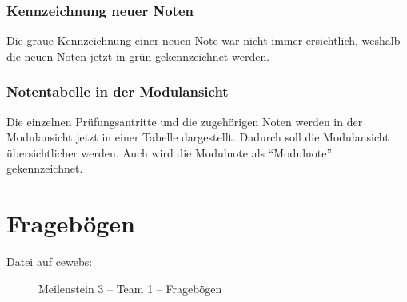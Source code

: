 \documentclass[a4paper,10pt]{scrartcl}
\begin{document}
\subsubsection*{Kennzeichnung neuer Noten}

Die graue Kennzeichnung einer neuen Note war nicht immer ersichtlich, weshalb die neuen Noten jetzt in grün gekennzeichnet werden.

\noindent{}
\medskip

\subsubsection*{Notentabelle in der Modulansicht}

Die einzelnen Prüfungsantritte und die zugehörigen Noten werden in der Modulansicht jetzt in einer Tabelle dargestellt. Dadurch soll die Modulansicht übersichtlicher werden. Auch wird
die Modulnote als ``Modulnote'' gekennzeichnet.

\noindent{}
\medskip



\section{Fragebögen}

\begin{description}
 \item[Datei auf cewebs:]Meilenstein 3 -- Team 1 -- Fragebögen
\end{description}
\end{document}
